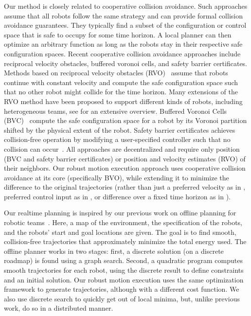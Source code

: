\documentclass{svproc}
\begin{document}
Our method is closely related to cooperative collision avoidance.
Such approaches assume that all robots follow the same strategy and can provide formal collision avoidance guarantees.
They typically find a subset of the configuration or control space that is safe to occupy for some time horizon.
A local planner can then optimize an arbitrary function as long as the robots stay in their respective safe configuration spaces.
Recent cooperative collision avoidance approaches include reciprocal velocity obstacles, buffered voronoi cells, and safety barrier certificates.
Methods based on reciprocal velocity obstacles (RVO)~\cite{RVO} assume that robots continue with constant velocity and compute the safe configuration space such that no other robot might collide for the time horizon. Many extensions of the RVO method have been proposed to support different kinds of robots, including heterogeneous teams, see \cite{epsilonCCA} for an extensive overview.
Buffered Voronoi Cells (BVC)~\cite{bufferedVoronoiCells} compute the safe configuration space for a robot by its Voronoi partition shifted by the physical extent of the robot. 
Safety barrier certificates achieves collision-free operation by modifying a user-specified controller such that no collision can occur~\cite{barrierCertificates}.
All approaches are decentralized and require only position (BVC and safety barrier certificates) or position and velocity estimates (RVO) of their neighbors.
Our robust motion execution approach uses cooperative collision avoidance at its core (specifically BVO), while extending it to minimize the difference to the original trajectories (rather than just a preferred velocity as in \cite{epsilonCCA}, preferred control input as in \cite{barrierCertificates}, or difference over a fixed time horizon as in \cite{bufferedVoronoiCells}).

Our realtime planning is inspired by our previous work on offline planning for robotic teams~\cite{crazyplanning-ieeetro}.
Here, a map of the environment, the specification of the robots, and the robots' start and goal locations are given.
The goal is to find smooth, collision-free trajectories that approximately minimize the total energy used.
The offline planner works in two stages: first, a discrete solution (on a discrete roadmap) is found using a graph search. Second, a quadratic program computes smooth trajectories for each robot, using the discrete result to define constraints and an initial solution.
Our robust motion execution uses the same optimization framework to generate trajectories, although with a different cost function.
We also use discrete search to quickly get out of local minima, but, unlike previous work, do so in a distributed manner.
\end{document}

